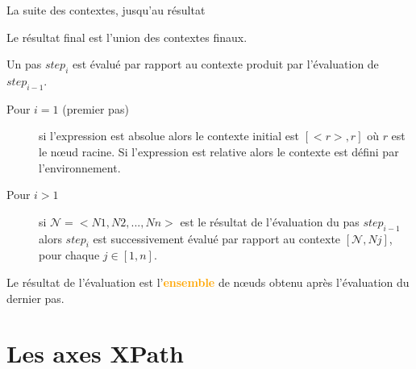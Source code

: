 \begin{frame}[allowframebreaks]{La suite des contextes, jusqu'au résultat}

\begin{center}
\end{center}

Le résultat final est l'union des contextes finaux. 

\framebreak
Un pas $step_i$ est évalué par rapport au contexte produit par l'évaluation de $step_{i-1}$. 

\begin{description}
 \item[Pour $i=1$ (premier pas)] si l'expression est \alert{absolue} alors le contexte initial est $[<r>,r]$
       où $r$ est le n{\oe}ud racine. Si l'expression est \alert{relative} alors le contexte est défini par l'environnement.
\item[Pour $i > 1$] si $\mathcal{N} =< N1,N2,...,Nn >$ est le résultat de l'évaluation du pas $step_{i-1}$ 
     alors $step_i$  est successivement évalué par rapport au contexte $[\mathcal{N},Nj]$, pour chaque $j \in [1,n]$.
\end{description}
Le résultat de l'évaluation est l'\textcolor{orange}{\textbf{ensemble}} de n{\oe}uds obtenu après l'évaluation du dernier pas.

\medskip


\end{frame}

\section{Les axes XPath}

